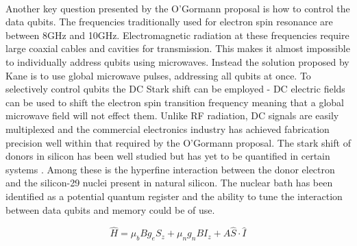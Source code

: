 \\
Another key question presented by the O'Gormann proposal is how to control the data qubits.
The frequencies traditionally used for electron spin resonance are between 8GHz and 10GHz. 
Electromagnetic radiation at these frequencies require large coaxial cables and cavities for transmission. 
This makes it almost impossible to individually address qubits using microwaves. 
Instead the solution proposed by Kane is to use global microwave pulses, addressing all qubits at once.
To selectively control qubits the DC Stark shift can be employed - DC electric fields can be used to shift the electron spin transition frequency meaning that a global microwave field will not effect them. 
Unlike RF radiation, DC signals are easily multiplexed and the commercial electronics industry has achieved fabrication precision well within that required by the O'Gormann proposal.
The stark shift of donors in silicon has been well studied but has yet to be quantified in certain systems \cite{Pica2014}.
Among these is the hyperfine interaction between the donor electron and the silicon-29 nuclei present in natural silicon.
The nuclear bath has been identified as a potential quantum register and the ability to tune the interaction between data qubits and memory could be of use. 


\begin{equation}
\hat{H} = \mu_bBg_eS_z + \mu_ng_nBI_z + A \hat{S}\cdot\hat{I}
\end{equation}


